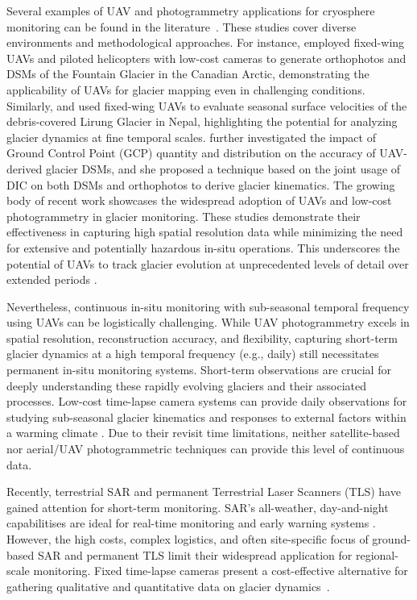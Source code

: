 Several examples of UAV and photogrammetry applications for cryosphere monitoring can be found in the literature~\citep{Bhardwaj2016, Gaffey2020}.
These studies cover diverse environments and methodological approaches.
For instance, \citet{Whitehead2013} employed fixed-wing UAVs and piloted helicopters with low-cost cameras to generate orthophotos and DSMs of the Fountain Glacier in the Canadian Arctic, demonstrating the applicability of UAVs for glacier mapping even in challenging conditions. 
Similarly, \citet{immerzeel2014} and \citet{kraaijenbrink2016} used fixed-wing UAVs to evaluate seasonal surface velocities of the debris-covered Lirung Glacier in Nepal, highlighting the potential for analyzing glacier dynamics at fine temporal scales.
\citet{Gindraux2017} further investigated the impact of Ground Control Point (GCP) quantity and distribution on the accuracy of UAV-derived glacier DSMs, and she proposed a technique based on the joint usage of DIC on both DSMs and orthophotos to derive glacier kinematics.
The growing body of recent work \citep{Benoit2019, Chudley2019, Jouvet2020, Cao2021,  ioli2021mid, Lamsters2022, belloni2023} showcases the widespread adoption of UAVs and low-cost photogrammetry in glacier monitoring. 
These studies demonstrate their effectiveness in capturing high spatial resolution data while minimizing the need for extensive and potentially hazardous in-situ operations.
This underscores the potential of UAVs to track glacier evolution at unprecedented levels of detail over extended periods \citep{ioli2021mid, belloni2023}.

Nevertheless, continuous in-situ monitoring with sub-seasonal temporal frequency using UAVs can be logistically challenging.
While UAV photogrammetry excels in spatial resolution, reconstruction accuracy, and flexibility, capturing short-term glacier dynamics at a high temporal frequency (e.g., daily) still necessitates permanent in-situ monitoring systems. 
Short-term observations are crucial for deeply understanding these rapidly evolving glaciers and their associated processes.
Low-cost time-lapse camera systems can provide daily observations for studying sub-seasonal glacier kinematics and responses to external factors within a warming climate \cite{Messerli2015}.  
Due to their revisit time limitations, neither satellite-based nor aerial/UAV photogrammetric techniques can provide this level of continuous data.

Recently, terrestrial SAR \cite{Luzi2007} and permanent Terrestrial Laser Scanners (TLS) \cite{Hendrickx2022, Voordendag2023} have gained attention for short-term monitoring. 
SAR's all-weather, day-and-night capabilitises are ideal for real-time monitoring and early warning systems \citep{Noferini2009, Dematteis2017_sar}. 
However, the high costs, complex logistics, and often site-specific focus of ground-based SAR and permanent TLS limit their widespread application for regional-scale monitoring.
Fixed time-lapse cameras present a cost-effective alternative for gathering qualitative and quantitative data on glacier dynamics~\citep{Maas2006, Messerli2015, Giordan2016, James2016}.

